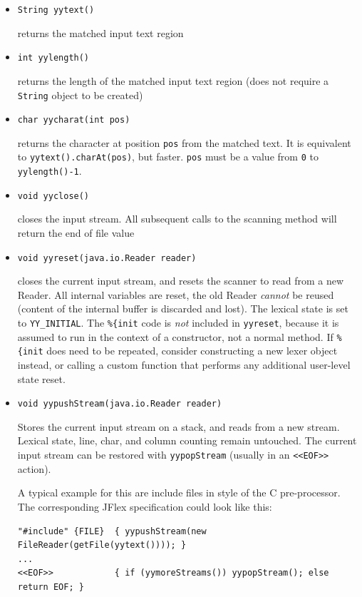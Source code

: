 \begin{itemize}
\item
  \texttt{String\ yytext()}

  returns the matched input text region
\item
  \texttt{int\ yylength()}

  returns the length of the matched input text region (does not require
  a \texttt{String} object to be created)
\item
  \texttt{char\ yycharat(int\ pos)}

  returns the character at position \texttt{pos} from the matched text.
  It is equivalent to \texttt{yytext().charAt(pos)}, but faster.
  \texttt{pos} must be a value from \texttt{0} to \texttt{yylength()-1}.
\item
  \texttt{void\ yyclose()}

  closes the input stream. All subsequent calls to the scanning method
  will return the end of file value
\item
  \texttt{void\ yyreset(java.io.Reader\ reader)}

  closes the current input stream, and resets the scanner to read from a
  new Reader. All internal variables are reset, the old Reader
  \emph{cannot} be reused (content of the internal buffer is discarded
  and lost). The lexical state is set to \texttt{YY\_INITIAL}. The
  \texttt{\%\{init} code is \emph{not} included in \texttt{yyreset},
  because it is assumed to run in the context of a constructor, not a
  normal method. If \texttt{\%\{init} does need to be repeated, consider
  constructing a new lexer object instead, or calling a custom function
  that performs any additional user-level state reset.
\item
  \texttt{void\ yypushStream(java.io.Reader\ reader)}

  Stores the current input stream on a stack, and reads from a new
  stream. Lexical state, line, char, and column counting remain
  untouched. The current input stream can be restored with
  \texttt{yypopStream} (usually in an
  \texttt{\textless{}\textless{}EOF\textgreater{}\textgreater{}}
  action).

  A typical example for this are include files in style of the C
  pre-processor. The corresponding JFlex specification could look like
  this:

\begin{verbatim}
"#include" {FILE}  { yypushStream(new FileReader(getFile(yytext()))); }
...
<<EOF>>            { if (yymoreStreams()) yypopStream(); else return EOF; }
\end{verbatim}


\end{itemize}
